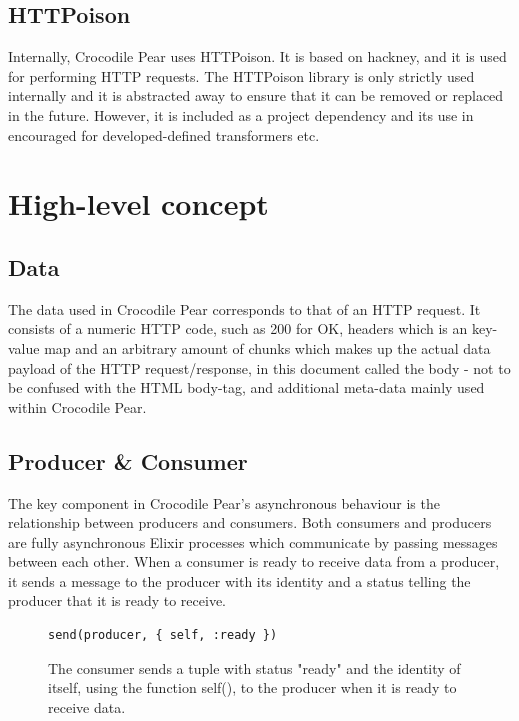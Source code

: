 \documentclass{cslthse-msc}
\begin{document}
\subsection{HTTPoison}
Internally, Crocodile Pear uses HTTPoison\cite{httpoison}. It is based on hackney\cite{hackney}, and it is used for performing HTTP requests. The HTTPoison library is only strictly used internally and it is abstracted away to ensure that it can be removed or replaced in the future. However, it is included as a project dependency and its use in encouraged for developed-defined transformers etc.

\section{High-level concept}

\subsection{Data}
The data used in Crocodile Pear corresponds to that of an HTTP request. It consists of a numeric HTTP code, such as 200 for OK, headers which is an key-value map and an arbitrary amount of chunks which makes up the actual data payload of the HTTP request/response, in this document called the body - not to be confused with the HTML body-tag, and additional meta-data mainly used within Crocodile Pear.

\subsection{Producer \& Consumer}
The key component in Crocodile Pear's asynchronous behaviour is the relationship between producers and consumers. Both consumers and producers are fully asynchronous Elixir processes which communicate by passing messages between each other. When a consumer is ready to receive data from a producer, it sends a message to the producer with its identity and a status telling the producer that it is ready to receive.

\begin{figure}[H]
  \centering
\begin{lstlisting}[breaklines=true,frame=single]
send(producer, { self, :ready })	
\end{lstlisting}
  \caption{The consumer sends a tuple with status "ready" and the identity of itself, using the function self(), to the producer when it is ready to receive data.}
\end{figure}
\end{document}
